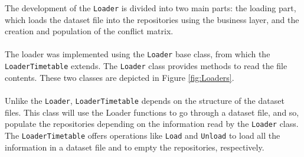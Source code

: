 The development of the \verb+Loader+ is divided into two main parts: the loading part, which loads the dataset file into the repositories using the business layer, and the creation and population of the conflict matrix.\\
\\
The loader was implemented using the \verb+Loader+ base class, from which the \verb+LoaderTimetable+ extends. The \verb+Loader+ class provides methods to read the file contents. These two classes are depicted in Figure \ref{fig:Loaders}.\\
\\
Unlike the \verb+Loader+, \verb+LoaderTimetable+ depends on the structure of the dataset files. This class will use the Loader functions to go through a dataset file, and so, populate the repositories depending on the information read by the \verb+Loader+ class. The \verb+LoaderTimetable+ offers operations like \verb+Load+ and \verb+Unload+ to load all the information in a dataset file and to empty the repositories, respectively.\\
\\
